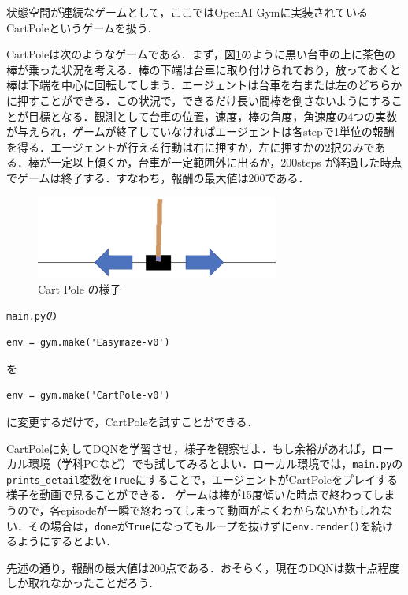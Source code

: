   状態空間が連続なゲームとして，ここではOpenAI Gymに実装されているCartPoleというゲームを扱う．

  CartPoleは次のようなゲームである．まず，図\ref{fig:cartpole}のように黒い台車の上に茶色の棒が乗った状況を考える．棒の下端は台車に取り付けられており，放っておくと棒は下端を中心に回転してしまう．エージェントは台車を右または左のどちらかに押すことができる．この状況で，できるだけ長い間棒を倒さないようにすることが目標となる．観測として台車の位置，速度，棒の角度，角速度の4つの実数が与えられ，ゲームが終了していなければエージェントは各stepで1単位の報酬を得る．エージェントが行える行動は右に押すか，左に押すかの2択のみである．棒が一定以上傾くか，台車が一定範囲外に出るか，200steps が経過した時点でゲームは終了する．すなわち，報酬の最大値は200である．

  \begin{figure}[htb]
   \centering
   \includegraphics[width=80mm]{images/TsuruokaLab/cartpole.eps}
   \caption{Cart Pole の様子}
   \label{fig:cartpole}
  \end{figure}

  \verb+main.py+の
  \begin{lstlisting}[basicstyle=\ttfamily\footnotesize, frame=single]
   env = gym.make('Easymaze-v0')
  \end{lstlisting}
  を
  \begin{lstlisting}[basicstyle=\ttfamily\footnotesize, frame=single]
   env = gym.make('CartPole-v0')
  \end{lstlisting}
  に変更するだけで，CartPoleを試すことができる．

  \begin{practice}
   CartPoleに対してDQNを学習させ，様子を観察せよ．もし余裕があれば，ローカル環境（学科PCなど）でも試してみるとよい．ローカル環境では，\verb+main.py+の\verb+prints_detail+変数を\verb+True+にすることで，エージェントがCartPoleをプレイする様子を動画で見ることができる．
   ゲームは棒が15度傾いた時点で終わってしまうので，各episodeが一瞬で終わってしまって動画がよくわからないかもしれない．その場合は，\verb+done+が\verb+True+になってもループを抜けずに\verb+env.render()+を続けるようにするとよい．
  \end{practice}

  先述の通り，報酬の最大値は200点である．おそらく，現在のDQNは数十点程度しか取れなかったことだろう．

